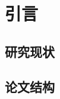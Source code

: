 \documentclass[index]{subfiles}
\begin{document}
\chapter{引言}
\section{研究现状}
\section{论文结构}
\end{document}
